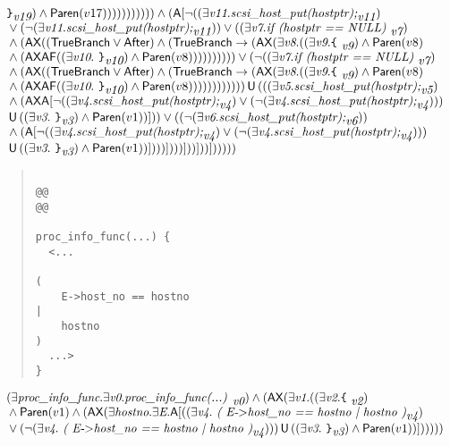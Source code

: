 \documentclass{article}
\newcommand{\U}{\,\mbox{\sf{U}}\,}
\newcommand{\A}{\mbox{\sf{A}}}
\newcommand{\AX}{\mbox{\sf{AX}}}
\newcommand{\AF}{\mbox{\sf{AF}}}
\newcommand{\mita}[1]{\mbox{\it{{#1}}}}
\newcommand{\msf}[1]{\mbox{\sf{{#1}}}}
\newcommand{\mth}[1]{\({#1}\)}
\newcommand{\ttlb}{\mbox{\tt \char'173}}
\newcommand{\ttrb}{\mbox{\tt \char'175}}
\begin{document}
\[\begin{array}{l}
{{\ttrb}}_{\mita{v19}}) \wedge \msf{Paren}(v17))))))))))) \wedge (\A[\neg ((\exists \mita{v11} . \mita{scsi\_host\_put(hostptr);}_{\mita{v11}})\\\mbox{} \vee (\neg (\exists \mita{v11} . \mita{scsi\_host\_put(hostptr);}_{\mita{v11}})) \vee ((\exists \mita{v7} . \mita{if (hostptr == NULL) }_{\mita{v7}})\\\mbox{} \wedge (\AX((\msf{TrueBranch} \vee \msf{After}) \wedge (\msf{TrueBranch} \rightarrow (\AX(\exists \mita{v8} . ((\exists \mita{v9} . \mita{{\ttlb}
  }_{\mita{v9}}) \wedge \msf{Paren}(v8)\\\mbox{} \wedge (\AX\AF((\exists \mita{v10} . \mita{
{\ttrb}}_{\mita{v10}}) \wedge \msf{Paren}(v8)))))))))) \vee (\neg ((\exists \mita{v7} . \mita{if (hostptr == NULL) }_{\mita{v7}})\\\mbox{} \wedge (\AX((\msf{TrueBranch} \vee \msf{After}) \wedge (\msf{TrueBranch} \rightarrow (\AX(\exists \mita{v8} . ((\exists \mita{v9} . \mita{{\ttlb}
  }_{\mita{v9}}) \wedge \msf{Paren}(v8)\\\mbox{} \wedge (\AX\AF((\exists \mita{v10} . \mita{
{\ttrb}}_{\mita{v10}}) \wedge \msf{Paren}(v8)))))))))))) \U (((\exists \mita{v5} . \mita{scsi\_host\_put(hostptr);}_{\mita{v5}})\\\mbox{} \wedge (\AX\A[\neg ((\exists \mita{v4} . \mita{scsi\_host\_put(hostptr);}_{\mita{v4}}) \vee (\neg (\exists \mita{v4} . \mita{scsi\_host\_put(hostptr);}_{\mita{v4}})))\\\mbox{} \U ((\exists \mita{v3} . \mita{
{\ttrb}}_{\mita{v3}}) \wedge \msf{Paren}(v1))]
)) \vee ((\neg (\exists \mita{v6} . \mita{scsi\_host\_put(hostptr);}_{\mita{v6}}))\\\mbox{} \wedge (\A[\neg ((\exists \mita{v4} . \mita{scsi\_host\_put(hostptr);}_{\mita{v4}}) \vee (\neg (\exists \mita{v4} . \mita{scsi\_host\_put(hostptr);}_{\mita{v4}})))\\\mbox{} \U ((\exists \mita{v3} . \mita{
{\ttrb}}_{\mita{v3}}) \wedge \msf{Paren}(v1))]
)))]
)))]
))]
))]
)))))
\end{array}\]

\begin{quote}\begin{verbatim}

@@
@@

proc_info_func(...) {
  <...
    
(
    E->host_no == hostno
|
    hostno
)
  ...>
}
\end{verbatim}\end{quote}

\[\begin{array}{l}
(\exists \mita{proc\_info\_func} . \exists \mita{v0} . \mita{proc\_info\_func(...) }_{\mita{v0}}) \wedge (\AX(\exists \mita{v1} . ((\exists \mita{v2} . \mita{{\ttlb}
  }_{\mita{v2}})\\\mbox{} \wedge \msf{Paren}(v1) \wedge (\AX(\exists \mita{hostno} . \exists \mita{E} . \A[((\exists \mita{v4} . \mita{
(
E-\mth{>}host\_no == hostno
|
hostno
)}_{\mita{v4}})\\\mbox{} \vee (\neg (\exists \mita{v4} . \mita{
(
E-\mth{>}host\_no == hostno
|
hostno
)}_{\mita{v4}}))) \U ((\exists \mita{v3} . \mita{
{\ttrb}}_{\mita{v3}}) \wedge \msf{Paren}(v1))]
)))))
\end{array}\]
\end{document}
